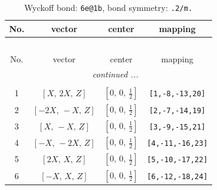 \documentclass[fleqn,8pt]{jsarticle}
\begin{document}
\renewcommand{\arraystretch}{1.2}
\begin{longtable}{cccc}
\caption{Wyckoff bond: {\tt 6e@1b}, bond symmetry: {\tt .2/m.}}
 \\
 \hline \hline
No. & vector & center & mapping \\ \hline \endfirsthead

\multicolumn{3}{l}{\tablename\ \thetable{}} \\
 \hline \hline
No. & vector & center & mapping \\ \hline \endhead

 \hline \hline
\multicolumn{3}{r}{\footnotesize\it continued ...} \\ \endfoot

 \hline \hline
\multicolumn{3}{r}{} \\ \endlastfoot

1 & $\left[ X,\, 2 X,\, Z \right]$ & $\left[ 0,\, 0,\, \frac{1}{2} \right]$ & {\tt [1,-8,-13,20]} \\ \hline
2 & $\left[ - 2 X,\, - X,\, Z \right]$ & $\left[ 0,\, 0,\, \frac{1}{2} \right]$ & {\tt [2,-7,-14,19]} \\ \hline
3 & $\left[ X,\, - X,\, Z \right]$ & $\left[ 0,\, 0,\, \frac{1}{2} \right]$ & {\tt [3,-9,-15,21]} \\ \hline
4 & $\left[ - X,\, - 2 X,\, Z \right]$ & $\left[ 0,\, 0,\, \frac{1}{2} \right]$ & {\tt [4,-11,-16,23]} \\ \hline
5 & $\left[ 2 X,\, X,\, Z \right]$ & $\left[ 0,\, 0,\, \frac{1}{2} \right]$ & {\tt [5,-10,-17,22]} \\ \hline
6 & $\left[ - X,\, X,\, Z \right]$ & $\left[ 0,\, 0,\, \frac{1}{2} \right]$ & {\tt [6,-12,-18,24]} \\
\end{longtable}
\renewcommand{\arraystretch}{1.2}
\end{document}
